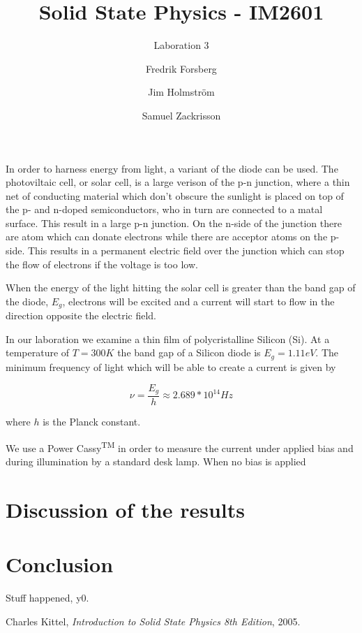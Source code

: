 \documentclass[a4paper,twoside=false,abstract=false,numbers=noenddot,
titlepage=false,headings=small,parskip=half,version=last]{scrartcl}
\title{Solid State Physics - IM2601}
\subtitle{Laboration 3}
\author[1]{Fredrik Forsberg}
\author[1]{Jim Holmström}
\author[1]{Samuel Zackrisson}
\affil[1]{Engineering Physics, Royal Institute of Technology}
\affil[1]{\{fforsber, jimho, samuelz\}@kth.se}
\begin{document}
\maketitle
\thispagestyle{empty}


In order to harness energy from light, a variant of the diode can be used. The photoviltaic cell, or solar cell, is a large verison of the p-n junction, where a thin net of conducting material which don't obscure the sunlight is placed on top of the p- and n-doped semiconductors, who in turn are connected to a matal surface. This result in a large p-n junction. On the n-side of the junction there are atom which can donate electrons while there are acceptor atoms on the p-side. This results in a permanent electric field over the junction which can stop the flow of electrons if the voltage is too low.

When the energy of the light hitting the solar cell is greater than the band gap of the diode, $E_g$, electrons will be excited and a current will start to flow in the direction opposite the electric field.



In our laboration we examine a thin film of polycristalline Silicon (Si). At a temperature of $T = 300 K$ the band gap of a Silicon diode is $E_g=1.11 eV$. The minimum frequency of light which will be able to create a current is given by

$$\nu = \frac{E_g}{h} \approx 2.689*10^{14} Hz$$

where $h$ is the Planck constant.


We use a Power Cassy\textsuperscript{TM} in order to measure the current under applied bias and during illumination by a standard desk lamp.
When no bias is applied 

\section{Discussion of the results}


\section{Conclusion}
Stuff happened, y0.

\begin{thebibliography}{1}
        Charles Kittel,
        {\em Introduction to Solid State Physics 8th Edition},
        2005.
\end{thebibliography}
\end{document}
